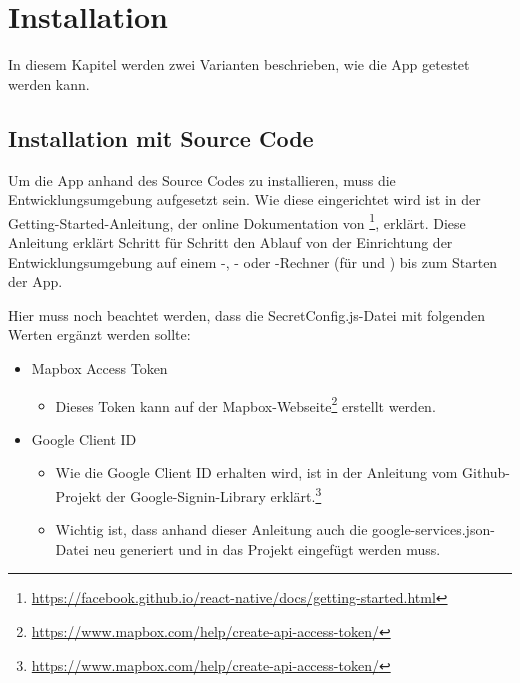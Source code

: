 \chapter{Installation}
\label{pd-installation}

In diesem Kapitel werden zwei Varianten beschrieben, wie die App getestet werden kann. 


\section{Installation mit Source Code}
Um die App anhand des Source Codes zu installieren, muss die  Entwicklungsumgebung aufgesetzt sein. 
Wie diese eingerichtet wird ist in der Getting-Started-Anleitung, der online Dokumentation von \footnote{\url{https://facebook.github.io/react-native/docs/getting-started.html}}, erklärt.
Diese Anleitung erklärt Schritt für Schritt den Ablauf von der Einrichtung der Entwicklungsumgebung auf einem -, - oder -Rechner (für  und ) bis zum Starten der App.

Hier muss noch beachtet werden, dass die SecretConfig.js-Datei \newline{}\newline mit folgenden Werten ergänzt werden sollte:

\begin{itemize}
	\item Mapbox Access Token
	\begin{itemize}
		\item Dieses Token kann auf der Mapbox-Webseite\footnote{\url{https://www.mapbox.com/help/create-api-access-token/}} erstellt werden.
	\end{itemize}
	
	\item Google Client ID 
	\begin{itemize}
		\item Wie die Google Client ID erhalten wird, ist in der Anleitung vom Github-Projekt der Google-Signin-Library erklärt.\footnote{\url{https://www.mapbox.com/help/create-api-access-token/}}
		\item Wichtig ist, dass anhand dieser Anleitung auch die google-services.json-Datei neu generiert und in das Projekt eingefügt werden muss.
	\end{itemize}
\end{itemize}

